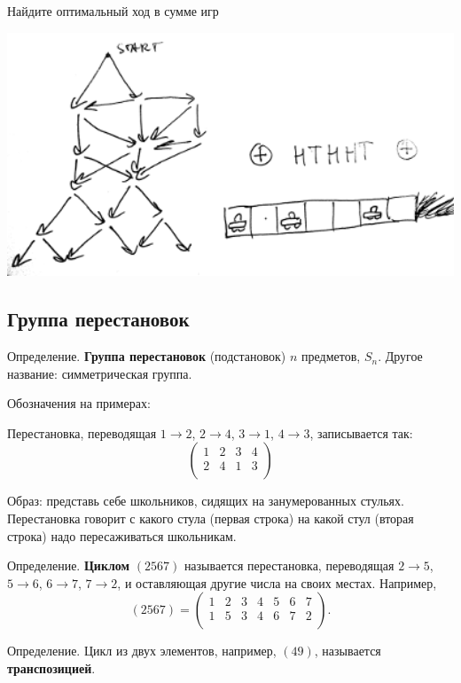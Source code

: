 \documentclass[12pt]{article} %
\begin{document}
Найдите оптимальный ход в сумме игр

\begin{minipage}[c]{0.5\textwidth}
\centering
        \includegraphics[width=16cm]{figure/game_sum.png}
\end{minipage}

\subsection{Группа перестановок}

Определение. \textbf{Группа перестановок} (подстановок) $n$ предметов, $S_n$. Другое название: симметрическая группа.

Обозначения на примерах:

Перестановка, переводящая $1\to 2$, $2\to 4$, $3\to 1$, $4\to 3$, записывается так:
\[
\begin{pmatrix}
  1 & 2 & 3 & 4 \\
  2 & 4 & 1 & 3 \\
\end{pmatrix}
\]

Образ: представь себе школьников, сидящих на занумерованных стульях. Перестановка говорит с какого стула (первая строка) на какой стул (вторая строка) надо пересаживаться школьникам.

Определение. \textbf{Циклом} $(2567)$ называется перестановка, переводящая $2\to 5$, $5 \to 6$, $6\to 7$, $7\to 2$, и оставляющая другие числа на своих местах. Например,
\[
(2567) =
\begin{pmatrix}
1 & 2 & 3 & 4 & 5 & 6 & 7 \\
1 & 5 & 3 & 4 & 6 & 7 & 2 \\
\end{pmatrix}.
\]

Определение. Цикл из двух элементов, например, $(49)$, называется \textbf{транспозицией}.
\end{document}
